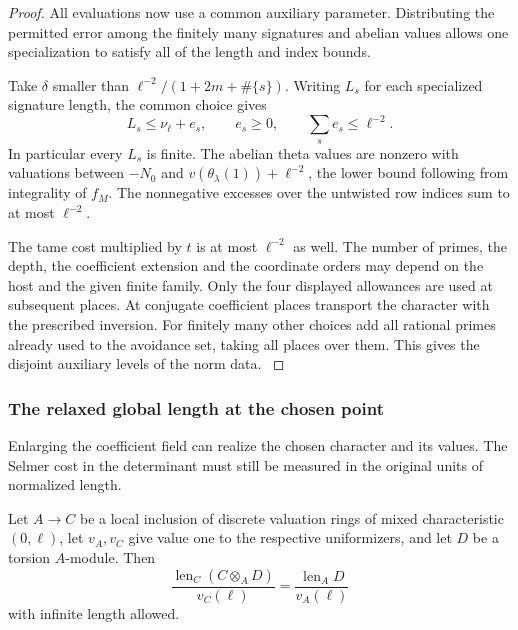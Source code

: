 \begin{proof}
All evaluations now use a common auxiliary parameter. Distributing the permitted error among the finitely many signatures and abelian values allows one specialization to satisfy all of the length and index bounds.

Take \(\delta\) smaller than \(\ell^{-2}/(1+2m+\#\{s\})\).
Writing \(L_s\) for each specialized signature length, the common choice gives
\[
 L_s\le\nu_\ell+e_s,\qquad e_s\ge0,\qquad \sum_s e_s\le\ell^{-2}.
\]
In particular every \(L_s\) is finite. The abelian
theta values are nonzero with valuations between \(-N_0\) and
\(v(\theta_\lambda(1))+\ell^{-2}\), the lower bound following
from integrality of \(f_M\). The nonnegative excesses over the
untwisted row indices sum to at most \(\ell^{-2}\).

The tame
cost multiplied by \(t\) is at most \(\ell^{-2}\) as well.
The number of primes, the depth, the coefficient extension and
the coordinate orders may depend on the host and the given
finite family. Only the four displayed allowances are used at
subsequent places. At conjugate coefficient places transport
the character with the prescribed inversion. For finitely many
other choices add all rational primes already used to the
avoidance set, taking all places over them. This gives the
disjoint auxiliary levels of the norm data. \label{cor:retained-twist-1}
\end{proof}

\subsubsection*{The relaxed global length at the chosen point}

Enlarging the coefficient field can realize the chosen character and its values. The Selmer cost in the determinant must still be measured in the original units of normalized length.

\begin{auxlemma}
\label{lem:retained-dvr-normalized-length}
Let \(A\to C\) be a local inclusion of discrete valuation rings of mixed
characteristic \((0,\ell)\), let \(v_A,v_C\) give value one to the respective
uniformizers, and let \(D\) be a torsion \(A\)-module. Then
\[
 \frac{\operatorname{len}_C(C\otimes_A D)}{v_C(\ell)}
   =\frac{\operatorname{len}_A D}{v_A(\ell)}
\]
with infinite length allowed.
\end{auxlemma}

